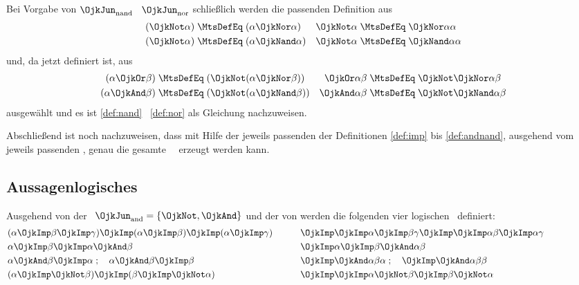 Bei Vorgabe von $\OjkJun_{\RawMtsIdxNand}$ \textbzgl\ $\OjkJun_{\RawMtsIdxNor}$ schließlich werden die passenden Definition aus
\begin{align}
(\OjkNot \alpha) & \;\MtsDefEq\; (\alpha \OjkNor \alpha)  &
\OjkNot  \alpha  & \;\MtsDefEq\;  \OjkNor \alpha \alpha   \label{def:notnor} \\
(\OjkNot \alpha) & \;\MtsDefEq\; (\alpha \OjkNand \alpha) &
\OjkNot  \alpha  & \;\MtsDefEq\;  \OjkNand \alpha \alpha  \label{def:notnand}
\end{align}
und, da \chrqt{\OjkNot} jetzt definiert ist, aus
\begin{align}
(\alpha \OjkOr \beta)  & \;\MtsDefEq\; (\OjkNot(\alpha \OjkNor \beta))  &
\OjkOr \alpha  \beta   & \;\MtsDefEq\;  \OjkNot \OjkNor \alpha \beta
\label{def:ornor} \\
(\alpha \OjkAnd \beta) & \;\MtsDefEq\; (\OjkNot(\alpha \OjkNand \beta)) &
\OjkAnd \alpha  \beta  & \;\MtsDefEq\;  \OjkNot \OjkNand \alpha \beta
\label{def:andnand}
\end{align}
ausgewählt und es ist \eqref{def:nand} \textbzgl\ \eqref{def:nor} als Gleichung nachzuweisen.

Abschließend ist noch nachzuweisen, dass mit Hilfe der jeweils passenden der Definitionen \eqref{def:imp} bis \eqref{def:andnand}, ausgehend vom jeweils passenden \OjkForx, genau die gesamte \Formelmenge\ \OjkFor\ erzeugt werden kann.

\subsection[Aussagenlogisches Axiomensystem]{Aussagenlogisches \Axiomensystem}%
\label                   {sub:Axiome}

Ausgehend von der \logischenSignatur\ $\OjkJun_{\RawMtsIdxAnd} = \{\OjkNot, \OjkAnd\}$ und der  von \chrqt{\OjkImp} werden die folgenden vier logischen \Axiome\ definiert:
\begin{align}
&
(\alpha\OjkImp\beta\OjkImp\gamma)\OjkImp(\alpha\OjkImp\beta)\OjkImp(\alpha\OjkImp\gamma)
\formulaspace &
& \OjkImp\OjkImp\alpha\OjkImp\beta\gamma\OjkImp\OjkImp\alpha\beta\OjkImp\alpha\gamma \\
%
& \alpha \OjkImp \beta \OjkImp \alpha \OjkAnd \beta
\formulaspace &
& \OjkImp \alpha \OjkImp \beta \OjkAnd \alpha \beta \\
%
& \alpha \OjkAnd \beta \OjkImp \alpha \;; \quad \alpha \OjkAnd \beta \OjkImp \beta
\formulaspace &
& \OjkImp \OjkAnd \alpha \beta \alpha \;; \quad \OjkImp \OjkAnd \alpha \beta \beta\\
%
&(\alpha \OjkImp \OjkNot \beta) \OjkImp (\beta \OjkImp \OjkNot \alpha)
\formulaspace &
& \OjkImp \OjkImp \alpha \OjkNot \beta \OjkImp \beta \OjkNot \alpha
\formulatoleft
%
\end{align}


